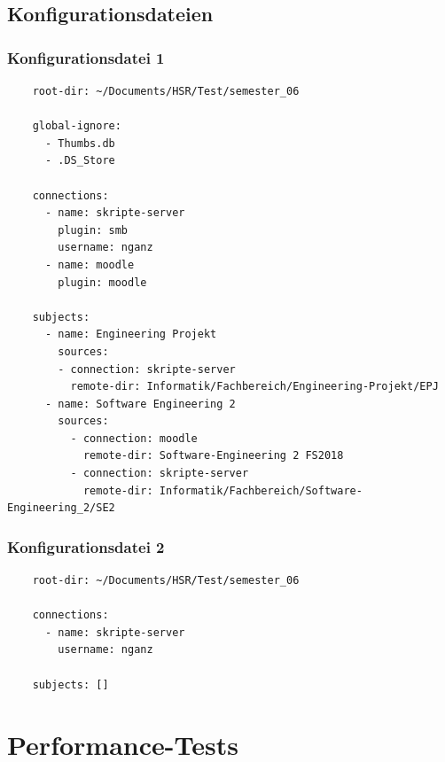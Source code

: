 \documentclass[a4paper]{article}
\let\oldsection\section
\renewcommand\section{\clearpage\oldsection}
\begin{document}
  \pagebreak

  \subsection{Konfigurationsdateien}

  \subsubsection{Konfigurationsdatei 1}

  \begin{verbatim}
    root-dir: ~/Documents/HSR/Test/semester_06

    global-ignore:
      - Thumbs.db
      - .DS_Store

    connections:
      - name: skripte-server
        plugin: smb
        username: nganz
      - name: moodle
        plugin: moodle

    subjects:
      - name: Engineering Projekt
        sources:
        - connection: skripte-server
          remote-dir: Informatik/Fachbereich/Engineering-Projekt/EPJ
      - name: Software Engineering 2
        sources:
          - connection: moodle
            remote-dir: Software-Engineering 2 FS2018
          - connection: skripte-server
            remote-dir: Informatik/Fachbereich/Software-Engineering_2/SE2
  \end{verbatim}

  \subsubsection{Konfigurationsdatei 2}

  \begin{verbatim}
    root-dir: ~/Documents/HSR/Test/semester_06

    connections:
      - name: skripte-server
        username: nganz

    subjects: []
  \end{verbatim}

  \section{Performance-Tests}
\end{document}
